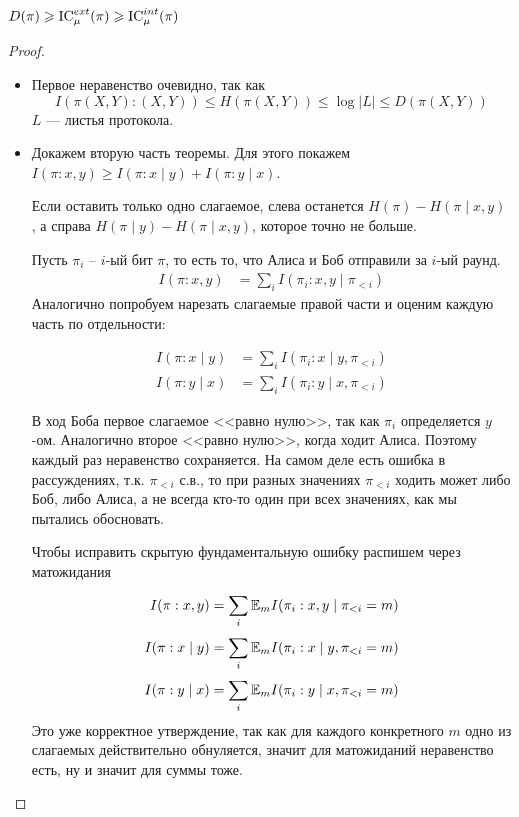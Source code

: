 \begin{thm}\label{thm:4_7_1}
	$ D( \pi) \geqslant  \operatorname{IC}_{\mu}^{ext}( \pi) \geqslant \operatorname{IC}_{ \mu}^{int}(\pi)$
\end{thm}
\begin{proof}
	\begin{itemize}
		\item Первое неравенство очевидно, так как 
    \[
        I(\pi(X, Y) : (X, Y)) \le H(\pi(X,Y)) \le \log |L| \le D(\pi(X, Y))
    \] 
    $ L$ --- листья протокола. 
    
		\item Докажем вторую часть теоремы. Для этого покажем $ I( \pi : x, y) \ge I( \pi : x \mid y) + I(\pi : y \mid x)$. 
    
    Если оставить только одно слагаемое, слева останется
    $ H( \pi ) - H( \pi \mid x, y)$
    , а справа 
    $ H( \pi \mid y ) - H( \pi \mid x, y)$, которое точно не больше.
    
    Пусть $  \pi_i$ -- $i $-ый бит $\pi$, то есть то, что Алиса и Боб отправили за $ i$-ый раунд.
    \begin{align*}
    	I( \pi : x, y) &= \tag{Chain rule} \sum_{i} I( \pi_i : x, y \mid \pi_{< i}) 
    \end{align*}
    Аналогично попробуем нарезать слагаемые правой части и оценим каждую часть по отдельности:
    
    \begin{align*}
    	I( \pi : x \mid y) & = \sum_{i}^{} I( \pi_i : x \mid y, \pi_{<i}) \\
    	I( \pi : y \mid x) & = \sum_{i}^{} I( \pi_i : y \mid x, \pi_{<i}) 
    \end{align*}
    
    В ход Боба первое слагаемое <<равно нулю>>, так как $  \pi_i$ определяется $ y $-ом. Аналогично второе <<равно нулю>>, когда ходит Алиса. Поэтому каждый раз неравенство сохраняется. На самом деле есть ошибка в рассуждениях, т.к. $\pi_{<i}$ с.в., то при разных значениях $\pi_{<i}$ ходить может либо Боб, либо Алиса, а не всегда кто-то один при всех значениях, как мы пытались обосновать.
    
    Чтобы исправить скрытую фундаментальную ошибку распишем через матожидания
    \begin{align*}
    	I( \pi : x, y) &= \sum_{i}^{} \mathbb{E}_{m}I( \pi_i : x, y \mid \pi_{< i} = m) \\
    	I( \pi : x \mid y) & = \sum_{i}^{} \mathbb{E}_m I( \pi_i : x \mid y, \pi_{<i} = m) \\
    	I( \pi : y \mid x) & = \sum_{i}^{} \mathbb{E}_mI( \pi_i : y \mid x, \pi_{<i} = m) 
    \end{align*}
    Это уже корректное утверждение, так как для каждого конкретного $m$ одно из слагаемых действительно обнуляется, значит для матожиданий неравенство есть, ну и значит для суммы тоже.
	\end{itemize}
\end{proof}


